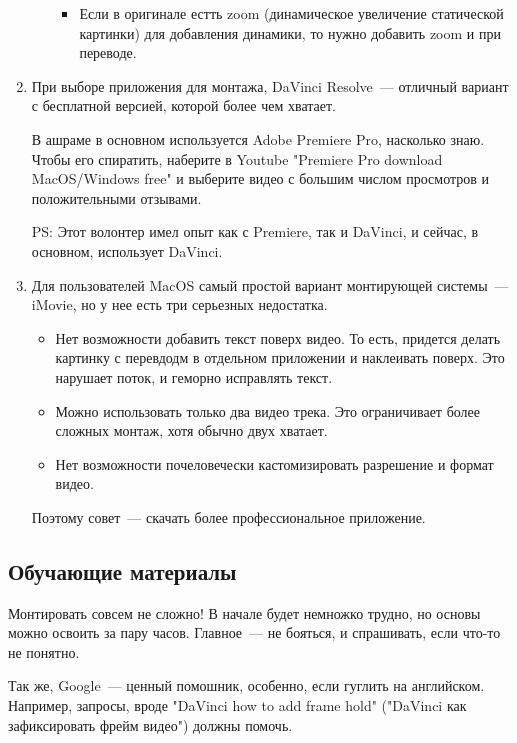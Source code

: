 \documentclass[
a4paper, %
12pt, %
article,
onecolumn, %
openany, %
]{memoir}
\begin{document}
\begin{enumerate}
\begin{itemize}
\begin{itemize}
            \item Если в оригинале естть zoom (динамическое увеличение
                статической картинки) для добавления динамики, то нужно
                добавить zoom и при переводе.

        \end{itemize}
    \end{itemize}
\item При выборе приложения для монтажа, DaVinci Resolve~---
    отличный вариант с бесплатной версией, которой более чем хватает. 

В ашраме в основном используется Adobe Premiere Pro, насколько знаю. 
Чтобы его спиратить, наберите в Youtube "Premiere Pro download
MacOS/Windows free" и выберите видео с большим числом просмотров и положительными отзывами.

PS: Этот волонтер имел опыт как с Premiere, так и DaVinci, и
сейчас, в основном, использует DaVinci.
\item Для пользователей MacOS самый простой вариант монтирующей системы~--- 
    iMovie, но у нее есть три серьезных недостатка.
    \begin{itemize}
    \item Нет возможности добавить текст поверх видео. То есть, придется делать
        картинку с перевдодм в отдельном приложении и наклеивать поверх.
        Это нарушает поток, и геморно исправлять текст.
    \item Можно использовать только два видео трека. Это ограничивает более 
        сложных монтаж, хотя обычно двух хватает.
    \item Нет возможности почеловечески кастомизировать разрешение и формат видео. 
\end{itemize}
    Поэтому совет~--- скачать более профессиональное приложение. 
\end{enumerate}





\subsection{Обучающие материалы}

Монтировать совсем не сложно! В начале будет немножко трудно, но основы можно 
освоить за пару часов. Главное~--- не бояться, и спрашивать, если что-то не понятно.

Так же, Google~--- ценный помошник, особенно, если гуглить на английском.
Например, запросы, вроде 
"DaVinci how to add frame hold" ("DaVinci как зафиксировать фрейм видео")
должны помочь.
\end{document}
